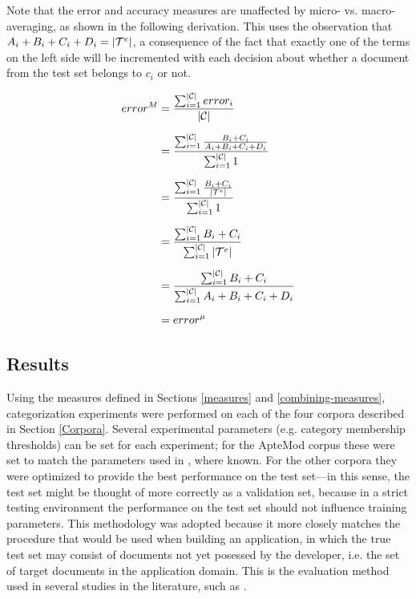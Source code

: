 Note that the error and accuracy measures are unaffected by micro-
vs. macro-averaging, as shown in the following derivation.  This uses
the observation that $A_i+B_i+C_i+D_i = |\mathcal{T}^e|$, a consequence of the
fact that exactly one of the terms on the left side will be
incremented with each decision about whether a document from the test
set belongs to $c_i$ or not.

\begin{equation*}
\begin{split}
error^M
 & = \frac{\sum_{i=1}^{|\mathcal{C}|}{error_i}}  {|\mathcal{C}|} \\[6pt]
 & = \frac{\sum_{i=1}^{|\mathcal{C}|}{ \frac{B_i+C_i}{A_i+B_i+C_i+D_i} }} { \sum_{i=1}^{|\mathcal{C}|}{1} } \\[6pt]
 & = \frac{\sum_{i=1}^{|\mathcal{C}|}{ \frac{B_i+C_i}{|\mathcal{T}^e|} }}         { \sum_{i=1}^{|\mathcal{C}|}{1} } \\[6pt]
 & = \frac{\sum_{i=1}^{|\mathcal{C}|}{B_i+C_i}}                           { \sum_{i=1}^{|\mathcal{C}|}{|\mathcal{T}^e|} } \\[6pt]
 & = \frac{\sum_{i=1}^{|\mathcal{C}|}{B_i+C_i}}                           { \sum_{i=1}^{|\mathcal{C}|}{A_i+B_i+C_i+D_i} } \\[6pt]
 & = error^\mu
\end{split}
\end{equation*}


\subsection{Results}

Using the measures defined in Sections \ref{measures} and
\ref{combining-measures}, categorization experiments were performed on
each of the four corpora described in Section \ref{Corpora}.  Several
experimental parameters (e.g. category membership thresholds) can be
set for each experiment; for the ApteMod corpus these were set to
match the parameters used in \cite{yang:99}, where known.  For the
other corpora they were optimized to provide the
best performance on the test set---in this sense, the test set might
be thought of more correctly as a validation set, because in a strict
testing environment the performance on the test set should not
influence training parameters.  This methodology was adopted because
it more closely matches the procedure that would be used when building
an application, in which the true test set may consist of documents
not yet posessed by the developer, i.e. the set of target documents
in the application domain.  This is the evaluation method used in
several studies in the literature, such as \cite{joachims:98}.

